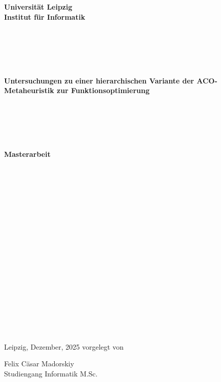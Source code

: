 \documentclass[fontsize=12, a4aper]{scrartcl}
\begin{document}
	
	
	
	\begin{center}
		
		\fontsize{14pt}{12pt}
		
		\textbf{Universität Leipzig}\\
		\textbf{Institut für Informatik}\\
		
	\end{center}
	
	\begin{verbatim}
		
		
		
		
	\end{verbatim}
	
	\begin{center}
		
		\fontsize{14pt}{12pt}
		
		\textbf{Untersuchungen zu einer hierarchischen Variante der ACO-Metaheuristik zur Funktionsoptimierung}
		
	\end{center}
	
	\begin{verbatim}
		
		
		
		
	\end{verbatim}
	
	\begin{center}
		
		\fontsize{18pt}{12pt}
		
		\textbf{Masterarbeit}
		
	\end{center}
	
	\begin{verbatim}
		
		
		
		
		
		
		
		
		
		
		
		
		
		
		
		
		
	\end{verbatim}
	
	\begin{flushright}
		
		Leipzig, Dezember, 2025 \hfill vorgelegt von\\
		
		\bigskip
		
		Felix Cäsar Madorskiy\\
		Studiengang Informatik M.Sc.
		
	\end{flushright}
	
\end{document}
